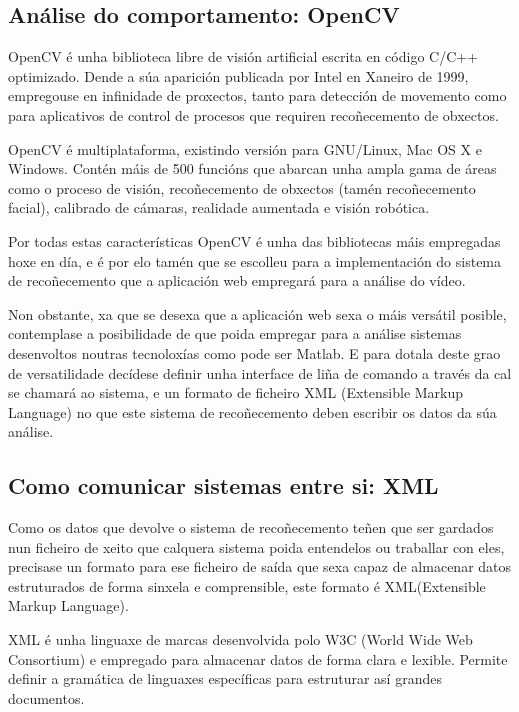 \subsection{Análise do comportamento: OpenCV}
    
    OpenCV é unha biblioteca libre de visión artificial escrita en código C/C++ optimizado.
    Dende a súa aparición publicada por Intel en Xaneiro de 1999, empregouse en infinidade 
    de proxectos, tanto para detección de movemento como para aplicativos de control de procesos
    que requiren recoñecemento de obxectos.
    
    OpenCV é multiplataforma, existindo versión para GNU/Linux, Mac OS X e Windows. Contén máis 
    de 500 funcións que abarcan unha ampla gama de áreas como o proceso de visión, recoñecemento
    de obxectos (tamén recoñecemento facial), calibrado de cámaras, realidade aumentada e visión
    robótica.
    
    Por todas estas características OpenCV é unha das bibliotecas máis empregadas hoxe en día, e é
    por elo tamén que se escolleu para a implementación do sistema de recoñecemento que a aplicación
    web empregará para a análise do vídeo.
    
    Non obstante, xa que se desexa que a aplicación web sexa o máis versátil posible, contemplase a
    posibilidade de que poida empregar para a análise sistemas desenvoltos noutras tecnoloxías como
    pode ser Matlab. E para dotala deste grao de versatilidade decídese definir unha interface de
    liña de comando a través da cal se chamará ao sistema, e un formato de ficheiro XML (Extensible 
    Markup Language) no que este sistema de recoñecemento deben escribir os datos da súa análise.
        
\subsection{Como comunicar sistemas entre si: XML}
    
    Como os datos que devolve o sistema de recoñecemento teñen que ser gardados nun ficheiro de 
    xeito que calquera sistema poida entendelos ou traballar con eles, precisase un formato para
    ese ficheiro de saída que sexa capaz de almacenar datos estruturados de forma sinxela e 
    comprensible, este formato é XML(Extensible Markup Language).

    XML é unha linguaxe de marcas desenvolvida polo W3C (World Wide Web Consortium) e empregado
    para almacenar datos de forma clara e lexible. Permite definir a gramática de linguaxes 
    específicas para estruturar así grandes documentos.
    

